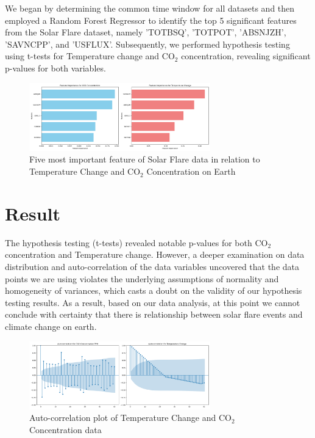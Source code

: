 \documentclass{article}
\begin{document}
We began by determining the common time window for all datasets and then employed a Random Forest Regressor to identify the top 5 significant features from the Solar Flare dataset, namely 'TOTBSQ', 'TOTPOT', 'ABSNJZH', 'SAVNCPP', and 'USFLUX'. Subsequently, we performed hypothesis testing using t-tests for Temperature change and CO$_2$ concentration, revealing significant p-values for both variables.

\begin{figure}[h]
    \centering
    \includegraphics[width=0.7\textwidth]{feature_importance_plot.png} %
    \caption{Five most important feature of Solar Flare data in relation to Temperature Change and CO$_2$ Concentration on Earth}
    \label{fig:example}
\end{figure}

\section{Result}

The hypothesis testing (t-tests) revealed notable p-values for both CO$_2$ concentration and Temperature change. However, a deeper examination on data distribution and auto-correlation of the data variables uncovered that the data points we are using violates the underlying assumptions of normality and homogeneity of variances, which casts a doubt on the validity of our hypothesis testing results. As a result, based on our data analysis, at this point we cannot conclude with certainty that there is relationship between solar flare events and climate change on earth.

\begin{figure}[h]
    \centering
    \includegraphics[width=0.7\textwidth]{autocorrelation_plots.png} %
    \caption{Auto-correlation plot of Temperature Change and CO$_2$ Concentration data}
    \label{fig:example}
\end{figure}
\end{document}
